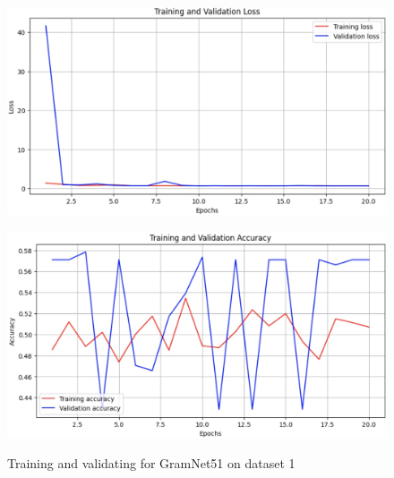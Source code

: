 \documentclass[rebuttal]{cvpr}
\begin{document}
\begin{figure}[t]
\centering
\begin{minipage}{0.45\linewidth}
   \includegraphics[width=\linewidth]{images/gramnet51_d1_loss.jpg}
   \label{fig:image1}
\end{minipage}
\hfill
\begin{minipage}{0.45\linewidth}
   \includegraphics[width=\linewidth]{images/gramnet51_d1_acc.jpg}
   \label{fig:image2}
\end{minipage}
\caption{Training and validating for GramNet51 on dataset 1}
\label{fig:gramnet51_d1}
\end{figure}
\end{document}
